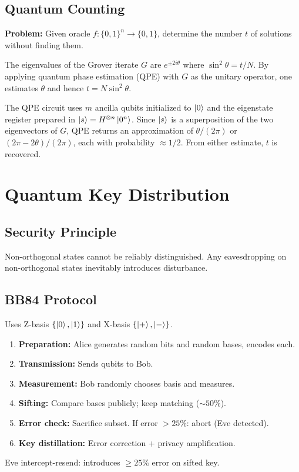 \documentclass[10pt,a4paper]{article}
\begin{document}
\subsection{Quantum Counting}

\textbf{Problem:} Given oracle $f:\{0,1\}^n\to\{0,1\}$, determine the number $t$ of solutions without finding them.

The eigenvalues of the Grover iterate $G$ are $e^{\pm 2i\theta}$ where $\sin^2\theta=t/N$. By applying quantum phase estimation (QPE) with $G$ as the unitary operator, one estimates $\theta$ and hence $t=N\sin^2\theta$.

The QPE circuit uses $m$ ancilla qubits initialized to $\ket{0}$ and the eigenstate register prepared in $\ket{s}=H^{\otimes n}\ket{0^n}$. Since $\ket{s}$ is a superposition of the two eigenvectors of $G$, QPE returns an approximation of $\theta/(2\pi)$ or $(2\pi-2\theta)/(2\pi)$, each with probability $\approx 1/2$. From either estimate, $t$ is recovered.

\section{Quantum Key Distribution}

\subsection{Security Principle}

Non-orthogonal states cannot be reliably distinguished. Any eavesdropping on non-orthogonal states inevitably introduces disturbance.

\subsection{BB84 Protocol}

\begin{tcolorbox}[algostyle, title={Algorithm: BB84 QKD}]
Uses Z-basis $\{\ket{0},\ket{1}\}$ and X-basis $\{\ket{+},\ket{-}\}$.
\begin{enumerate}[nosep]
\item \textbf{Preparation:} Alice generates random bits and random bases, encodes each.
\item \textbf{Transmission:} Sends qubits to Bob.
\item \textbf{Measurement:} Bob randomly chooses basis and measures.
\item \textbf{Sifting:} Compare bases publicly; keep matching ($\sim 50\%$).
\item \textbf{Error check:} Sacrifice subset. If error $>25\%$: abort (Eve detected).
\item \textbf{Key distillation:} Error correction + privacy amplification.
\end{enumerate}
Eve intercept-resend: introduces $\ge 25\%$ error on sifted key.
\end{tcolorbox}
\end{document}
